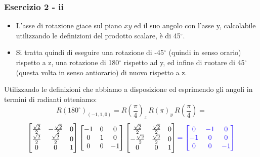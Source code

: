\documentclass{beamer}
\begin{document}
\begin{frame}
\frametitle{Esercizio 2 - ii}
\begin{itemize}
\item L'asse di rotazione giace sul piano $xy$ ed il suo angolo con l'asse y,
calcolabile utilizzando le definizioni del prodotto scalare, \`e di
45$^\circ$.  
\item Si tratta quindi di eseguire una rotazione di -45$^\circ$ (quindi in senso orario) rispetto a z,
una rotazione di 180$^\circ$ rispetto ad y, ed infine di ruotare di 45$^\circ$ (questa volta in senso antiorario) di nuovo
rispetto a z.  
\end{itemize}
Utilizzando le definizioni che abbiamo a disposizione ed esprimendo gli angoli in termini di radianti otteniamo:
%
\begin{displaymath}
R(180^\circ)_{(-1,1,0)}= R(\frac{\pi}{4})_z~R(\pi)_y~R(\frac{\pi}{4})=
\end{displaymath}
\begin{displaymath}
\begin{bmatrix}
\frac{\sqrt{2}}{2}  & -\frac{\sqrt{2}}{2} & 0 \\
\frac{\sqrt{2}}{2} &  \frac{\sqrt{2}}{2}& 0 \\ 
0  &  0 & 1 
\end{bmatrix}
\begin{bmatrix}
-1  & 0   & 0 \\
0   & 1  & 0 \\ 
0   &  0  & -1 
\end{bmatrix}
\begin{bmatrix}
\frac{\sqrt{2}}{2}  & \frac{\sqrt{2}}{2} & 0 \\
-\frac{\sqrt{2}}{2} &  \frac{\sqrt{2}}{2}& 0 \\ 
0  &  0 & 1 
\end{bmatrix}
{\color[rgb]{0.1,0,1}
=
\begin{bmatrix}
0  & -1 & 0 \\
-1 &  0 & 0 \\ 
0  &  0 & -1 
\end{bmatrix}
}
\end{displaymath}
\end{frame}
\end{document}

